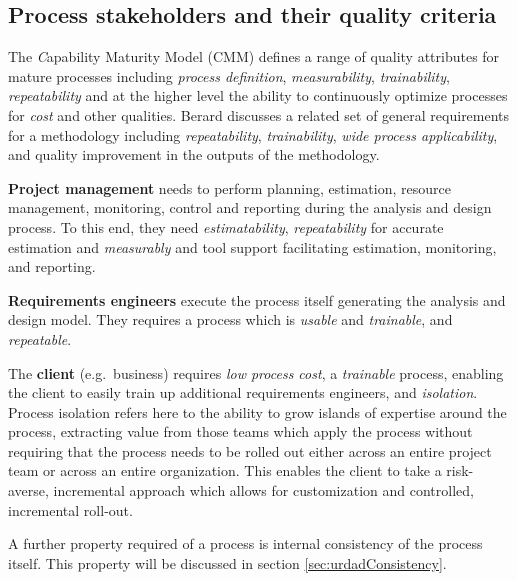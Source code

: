 
\subsection{Process stakeholders and their quality criteria}

The {\emph Capability Maturity Model} (CMM) \cite{paulk_capability_1993} defines a range of quality attributes for mature processes including \emph{process definition}, \emph{measurability}, \emph{trainability}, \emph{repeatability} and at the higher level the ability to continuously optimize processes for \emph{cost} and other qualities. Berard\cite{berard_what_1995} discusses a related set of general requirements for a methodology including \emph{repeatability}, \emph{trainability}, \emph{wide process applicability}, and quality improvement in the outputs of the methodology. 

{\bf Project management} needs to perform planning, estimation, resource management, monitoring, control and reporting during the analysis and design process. To this end, they need \emph{estimatability}, \emph{repeatability} for accurate estimation and \emph{measurably} and tool support facilitating estimation, monitoring, and reporting.

{\bf Requirements engineers} execute the process itself generating the analysis and design model. They requires a process which is \emph{usable} and \emph{trainable}, and \emph{repeatable}.

The {\bf client} (e.g.\ business) requires \emph{low process cost}, a \emph{trainable} process, enabling the client to easily train up additional requirements engineers, and \emph{isolation}. Process isolation refers here to the ability to grow islands of expertise around the process, extracting value from those teams which apply the process without requiring that the process needs to be rolled out either across an entire project team or across an entire organization. This enables the client to take a risk-averse, incremental approach which allows for customization and controlled, incremental roll-out.

A further property required of a process is internal consistency of the process itself. This property will be discussed in section \ref{sec:urdadConsistency}.

